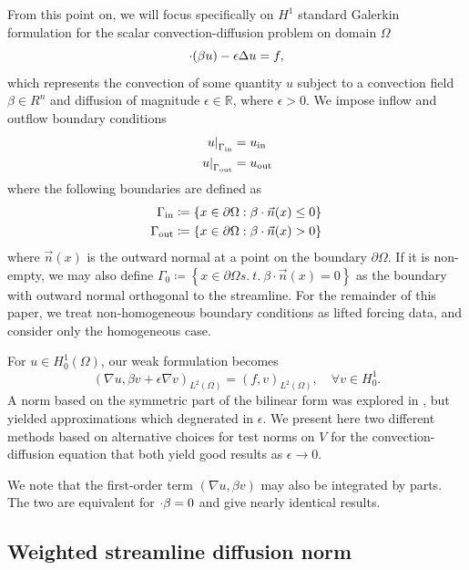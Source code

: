 \documentclass[final,leqno]{siamltex}
\newcommand{\mbb}[1]{\mathbb{#1}}
\newcommand{\LRp}[1]{\left( #1 \right)}
\newcommand{\LRc}[1]{\left\{ #1 \right\}}
\newcommand{\Grad} {\ensuremath{\nabla}}
\renewcommand{\L}{L^2\LRp{\Omega}}
\newcommand{\del}{\Delta}
\let\grad\relax
\newcommand{\grad}{\nabla}
\renewcommand{\div}{\grad \cdot}
\begin{document}
From this point on, we will focus specifically on $H^1$ standard Galerkin formulation for the scalar convection-diffusion problem on domain $\Omega$
\[
\div(\beta u) - \epsilon \del u = f,
\]
which represents the convection of some quantity $u$ subject to a convection field $\beta \in R^n$ and diffusion of magnitude $\epsilon \in \mbb{R}$, where $\epsilon > 0$.  We impose inflow and outflow boundary conditions
\begin{align*}
\left.u\right|_{\Gamma_{\rm in}} &= u_{\rm in}\\
\left.u\right|_{\Gamma_{\rm out}} &= u_{\rm out}
\end{align*}
where the following boundaries are defined as 
\begin{align*}
\Gamma_{\rm in}\coloneqq \LRc{x\in \partial \Omega:  \beta\cdot\vec{n}(x) \leq 0}\\
\Gamma_{\rm out}\coloneqq \LRc{x\in \partial \Omega: \beta\cdot\vec{n}(x) > 0}
\end{align*}
where $\vec{n}(x)$ is the outward normal at a point on the boundary $\partial \Omega$.  If it is non-empty, we may also define $\Gamma_{0}\coloneqq \LRc{x\in \partial \Omega s.\ t.\ \beta\cdot\vec{n}(x) = 0}$ as the boundary with outward normal orthogonal to the streamline.  For the remainder of this paper, we treat non-homogeneous boundary conditions as lifted forcing data, and consider only the homogeneous case.  

For $u\in H^1_0(\Omega)$, our weak formulation becomes
\[
\LRp{\Grad u,\beta v + \epsilon \Grad v}_{\L} = \LRp{f,v}_{\L}, \quad \forall v \in H^1_0.
\]
A norm based on the symmetric part of the bilinear form was explored in \cite{DahmenVariationalStabilization}, but yielded approximations which degnerated in $\epsilon$.  We present here two different methods based on alternative choices for test norms on $V$ for the convection-diffusion equation that both yield good results as $\epsilon\rightarrow 0$.  

We note that the first-order term $\LRp{\Grad u,\beta v}$ may also be integrated by parts.  The two are equivalent for $\div \beta = 0$ and give nearly identical results.

\subsection{Weighted streamline diffusion norm}
\end{document}
